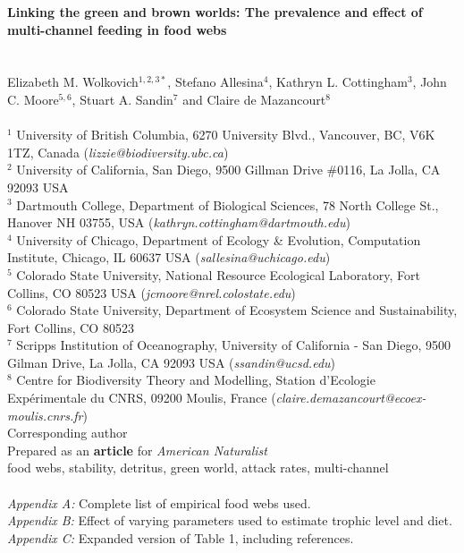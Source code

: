 \documentclass[12pt,a4paper,oneside]{article}
\begin{document}
{ \noindent \bf Linking the green and brown worlds: The prevalence and
 effect of multi-channel feeding in food webs}\\
\\
 \\
\noindent Elizabeth M. Wolkovich\(^{1,2,3*}\), Stefano Allesina\(^{4}\), Kathryn
L. Cottingham\(^{3}\), John C. Moore\(^{5,6}\), Stuart A. Sandin\(^{7}\) and Claire de
Mazancourt\(^{8}\)\\
\\
\noindent \(^{1}\) University of British Columbia, 6270 University Blvd., Vancouver, BC, V6K 1TZ, Canada (\emph{lizzie@biodiversity.ubc.ca})\\
\noindent \(^{2}\) University of California, San Diego, 9500 Gillman
Drive \#0116, La Jolla, CA 92093 USA\\
\noindent \(^{3}\) Dartmouth College, Department of Biological
Sciences, 78 North College St., Hanover NH 03755,
USA (\emph{kathryn.cottingham@dartmouth.edu})\\
\noindent \(^{4}\) University of Chicago, Department of Ecology \&
Evolution, Computation Institute, Chicago, IL 60637 USA (\emph{sallesina@uchicago.edu})\\ 
\noindent \(^{5}\) Colorado State University, National Resource Ecological Laboratory, Fort
Collins, CO 80523 USA \newline
(\emph{jcmoore@nrel.colostate.edu})\\ 
\noindent \(^{6}\) Colorado State University, Department of Ecosystem Science and Sustainability, Fort Collins, CO 80523\\
\noindent \(^{7}\) Scripps Institution of Oceanography, University of
California - San Diego, 9500 Gilman Drive, La Jolla, CA 92093 USA
(\emph{ssandin@ucsd.edu}) \\
\noindent \(^{8}\) Centre for Biodiversity Theory and Modelling, Station d'Ecologie Exp\'{e}rimentale du CNRS, 09200 Moulis, France 
(\emph{claire.demazancourt@ecoex-moulis.cnrs.fr})\\
\noindent * Corresponding author
\\

\noindent Prepared as an {\bf article} for \emph{American
 Naturalist}\\

 food webs, stability, detritus, green world, attack
rates, multi-channel\\

\\
\noindent \emph{Appendix A:} Complete list of empirical food webs used.\\
\noindent \emph{Appendix B:} Effect of varying parameters used to
estimate trophic level and diet. 
\noindent \emph{Appendix C:} Expanded version of Table 1, including references. \\
\end{document}
